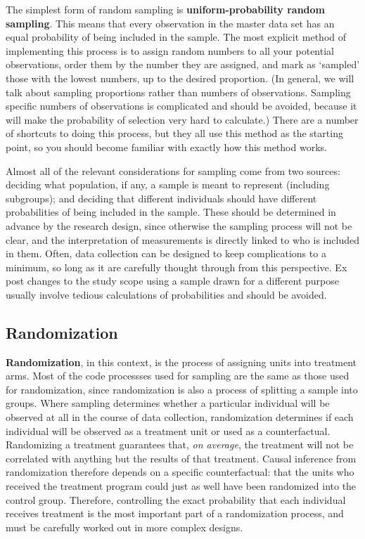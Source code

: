 The simplest form of random sampling is \textbf{uniform-probability random sampling}.
This means that every observation in the master data set
has an equal probability of being included in the sample.
The most explicit method of implementing this process
is to assign random numbers to all your potential observations,
order them by the number they are assigned,
and mark as `sampled' those with the lowest numbers, up to the desired proportion.
(In general, we will talk about sampling proportions rather than numbers of observations.
Sampling specific numbers of observations is complicated and should be avoided,
because it will make the probability of selection very hard to calculate.)
There are a number of shortcuts to doing this process,
but they all use this method as the starting point,
so you should become familiar with exactly how this method works.

Almost all of the relevant considerations for sampling come from two sources:
deciding what population, if any, a sample is meant to represent (including subgroups);
and deciding that different individuals should have different probabilities
of being included in the sample.
These should be determined in advance by the research design,
since otherwise the sampling process will not be clear,
and the interpretation of measurements is directly linked to who is included in them.
Often, data collection can be designed to keep complications to a minimum,
so long as it are carefully thought through from this perspective.
Ex post changes to the study scope using a sample drawn for a different purpose
usually involve tedious calculations of probabilities and should be avoided.

\subsection{Randomization}

\textbf{Randomization}, in this context, is the process of assigning units into treatment arms.
Most of the code processses used for sampling are the same as those used for randomization,
since randomization is also a process of splitting a sample into groups.
Where sampling determines whether a particular individual
will be observed at all in the course of data collection,
randomization determines if each individual will be observed
as a treatment unit or used as a counterfactual.
Randomizing a treatment guarantees that, \textit{on average},
the treatment will not be correlated with anything but the results of that treatment.\cite{duflo2007using}
Causal inference from randomization therefore depends on a specific counterfactual:
that the units who received the treatment program
could just as well have been randomized into the control group.
Therefore, controlling the exact probability that each individual receives treatment
is the most important part of a randomization process,
and must be carefully worked out in more complex designs.

